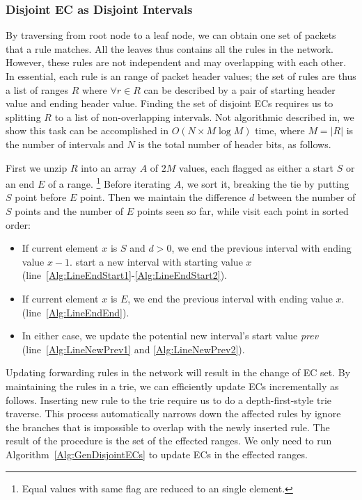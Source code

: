 \subsubsection{Disjoint EC as Disjoint Intervals}
By traversing from root node to a leaf node, we can obtain one set of packets
that a rule matches.
All the leaves thus contains all the rules in the network.
However, these rules are not independent and may overlapping with each other.
In essential, each rule is an range of packet header values;
the set of rules are thus a list of ranges $R$ where $\forall r \in R$ can be
described by a pair of starting header value and ending header value.
Finding the set of disjoint ECs requires us to splitting $R$ to
a list of non-overlapping intervals.
Not algorithmic described in\cite{Veriflow},
we show this task can be accomplished in $O(N \times M\log M)$ time,
where $M=|R|$ is the number of intervals and $N$ is the total number of header bits,
as follows\cite{SplitDisjointInterval}.

First we unzip $R$ into an array $A$ of $2M$ values,
each flagged as either a start $S$ or an end $E$ of a range.
\footnote{Equal values with same flag are reduced to an single element.}
Before iterating $A$, we sort it, breaking the tie by putting $S$ point before $E$ point.
Then we maintain the difference $d$ between the number of $S$ points and the number of $E$ points
seen so far, while visit each point in sorted order:
\begin{itemize}
\item If current element $x$ is $S$ and $d > 0$,
        we end the previous interval with ending value $x - 1$.
        start a new interval with starting value $x$
        (line~\ref{Alg:LineEndStart1}-\ref{Alg:LineEndStart2}).
\item If current element $x$ is $E$, we end the previous interval with ending value $x$.
        (line~\ref{Alg:LineEndEnd}).
\item In either case, we update the potential new interval's start value \textit{prev}
        (line~\ref{Alg:LineNewPrev1} and \ref{Alg:LineNewPrev2}).
\end{itemize}

Updating forwarding rules in the network will result in the change of EC set.
By maintaining the rules in a trie, we can efficiently update ECs incrementally as follows.
Inserting new rule to the trie require us to do a depth-first-style trie traverse.
This process automatically narrows down the affected rules by ignore the branches
that is impossible to overlap with the newly inserted rule.
The result of the procedure is the set of the effected ranges.
We only need to run Algorithm~\ref{Alg:GenDisjointECs} to update ECs in the effected ranges.

